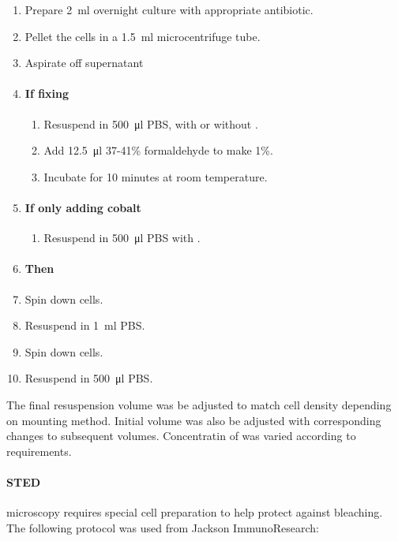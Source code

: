\documentclass[../main.tex]{subfiles}
\begin{document}
\begin{enumerate}
\item Prepare \SI{2}{\milli\litre} overnight culture with appropriate antibiotic.
\item Pellet the cells in a \SI{1.5}{\milli\litre} microcentrifuge tube.
\item Aspirate off supernatant
\item \paragraph{If fixing}
\begin{enumerate}
\item Resuspend in \SI{500}{\micro\litre} PBS, with or without .
\item Add \SI{12.5}{\micro\litre} 37-41\% formaldehyde to make 1\%.
\item Incubate for 10 minutes at room temperature.
\end{enumerate}
\item \paragraph{If only adding cobalt}
\begin{enumerate}
\item Resuspend in \SI{500}{\micro\litre} PBS with .
\end{enumerate}
\item[] \paragraph{Then}
\item Spin down cells.
\item Resuspend in \SI{1}{\milli\litre} PBS.
\item Spin down cells.
\item Resuspend in \SI{500}{\micro\litre} PBS.
\end{enumerate}

The final resuspension volume was be adjusted to match cell density depending on mounting method. Initial volume was also be adjusted with corresponding changes to subsequent volumes. Concentratin of  was varied according to requirements.

\paragraph{STED} microscopy requires special cell preparation to help protect against bleaching. The following protocol was used from Jackson ImmunoResearch\cite{jackson}:
\end{document}
